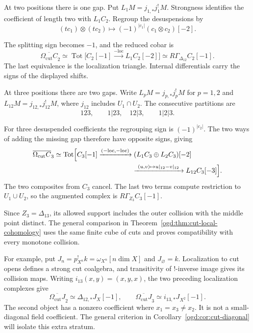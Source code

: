 At\label{ogd:def:binary-cut-localization} two positions there is one gap. Put
$L_1M=j_{1,*}j_1^!M$.
Strongness identifies the coefficient of length two with $L_1C_2$.
Regroup the desuspensions by
\[
 (tc_1)\otimes(tc_2)\longmapsto
       (-1)^{|c_1|}(c_1\otimes c_2)[-2].
\]

The splitting sign becomes $-1$, and the reduced cobar is
\begin{equation}\label{ogd:eq:two-cut-cobar}
 \overline{\Omega_{\mathrm{cut}}C}_2
  \simeq\operatorname{Tot}\bigl[C_2[-1]
                 \xrightarrow{-\mathrm{loc}}L_1C_2[-2]\bigr]
  \simeq R\Gamma_{\Delta_{12}}C_2[-1].
\end{equation}
The last equivalence is the localization triangle.
Internal differentials carry the signs of the displayed shifts.

At\label{ogd:def:ternary-cut-localizations} three positions there are two gaps. Write
$L_pM=j_{p,*}j_p^!M$ for $p=1,2$ and
$L_{12}M=j_{12,*}j_{12}^!M$, where $j_{12}$ includes $U_1\cap U_2$.
The consecutive partitions are
\[
 123,\qquad 1|23,\quad 12|3,\qquad 1|2|3.
\]

For three desuspended coefficients the regrouping sign is
$(-1)^{|c_2|}$. The two ways of adding the missing gap therefore
have opposite signs, giving
\begin{equation}\label{ogd:eq:three-cut-cobar}
 \begin{aligned}
 \overline{\Omega_{\mathrm{cut}}C}_3
 &\simeq\operatorname{Tot}\Bigl[
 C_3[-1]\xrightarrow{(-\mathrm{loc},-\mathrm{loc})}
 (L_1C_3\oplus L_2C_3)[-2]\\
 &\hspace{40mm}\xrightarrow{\ (u,v)\mapsto u|_{12}-v|_{12}\ }
 L_{12}C_3[-3]\Bigr].
 \end{aligned}
\end{equation}
The two composites from $C_3$ cancel. The last two terms compute
restriction to $U_1\cup U_2$, so the augmented complex is
$R\Gamma_{Z_3}C_3[-1]$.

Since $Z_3=\Delta_{13}$, its allowed support includes the outer collision
with the middle point distinct.
The general comparison in Theorem~\ref{ogd:thm:cut-local-cohomology}
uses the same finite cube of cuts and proves compatibility with every
monotone collision.

For\label{ogd:def:word-dualizing-coalgebra} example, put $J_n=p_{X^n}^!k=\omega_{X^n}[n\dim X]$ and
$J_\varnothing=k$. Localization to cut opens defines a strong cut
coalgebra, and transitivity of $!$-inverse image gives its collision maps.
Writing $i_{13}(x,y)=(x,y,x)$, the two preceding localization complexes give
\begin{equation}\label{ogd:eq:cut-dualizing}
 \overline{\Omega_{\mathrm{cut}}J}_2
    \simeq\Delta_{12,*}J_X[-1],\qquad
 \overline{\Omega_{\mathrm{cut}}J}_3
    \simeq i_{13,*}J_{X^2}[-1].
\end{equation}
The second object has a nonzero coefficient where $x_1=x_3\ne x_2$.
It is not a small-diagonal field coefficient. The general criterion in
Corollary~\ref{ogd:cor:cut-diagonal} will isolate this extra stratum.

